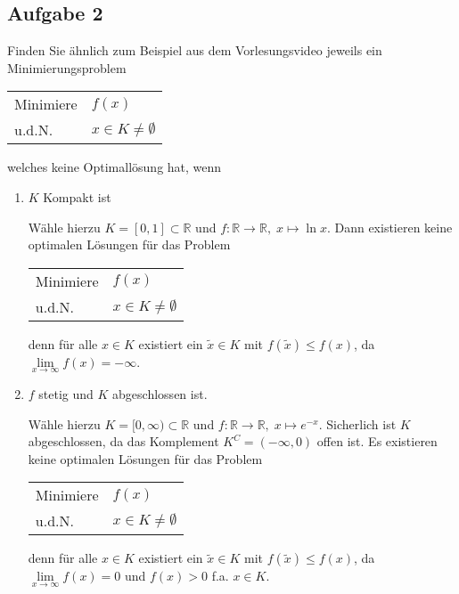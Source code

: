 \documentclass{article}
\begin{document}
\subsection*{Aufgabe 2} Finden Sie ähnlich zum Beispiel aus dem Vorlesungsvideo jeweils ein Minimierungsproblem
\begin{center}
\begin{tabular}{ll}
Minimiere & $f(x)$ \\
u.d.N. & $x \in K \neq \emptyset$\\
\end{tabular}
\end{center}
welches keine Optimallösung hat, wenn
\begin{enumerate}[label=(\alph*)]
\item $K$ Kompakt ist \par \smallskip
Wähle hierzu $K = [0,1] \subset \mathbb{R}$ und $f: \mathbb{R} \to \mathbb{R}, \; x \mapsto \ln{x}$. Dann existieren keine optimalen Lösungen für das Problem \begin{center}
\begin{tabular}{ll}
Minimiere & $f(x)$ \\
u.d.N. & $x \in K \neq \emptyset$\\
\end{tabular}
\end{center}
denn für alle $x \in K$ existiert ein $\tilde{x} \in K$ mit $f(\tilde{x}) \leq f(x)$, da $\lim\limits_{x\to \infty}{f(x)} = - \infty$.
\item $f$ stetig und $K$ abgeschlossen ist.\par \smallskip
Wähle hierzu $K = [0, \infty) \subset \mathbb{R}$ und $f: \mathbb{R} \to \mathbb{R}, \; x \mapsto e^{-x}$. Sicherlich ist $K$ abgeschlossen, da das Komplement $K^C = (-\infty,0)$ offen ist.\newline
Es existieren keine optimalen Lösungen für das Problem
\begin{center}
\begin{tabular}{ll}
Minimiere & $f(x)$ \\
u.d.N. & $x \in K \neq \emptyset$\\
\end{tabular}
\end{center}
denn für alle $x \in K$ existiert ein $\tilde{x} \in K$ mit $f(\tilde{x}) \leq f(x)$, da $\lim\limits_{x \to \infty}{f(x)} = 0$ und $f(x) > 0$ f.a. $x \in K$.
\end{enumerate}
\end{document}
